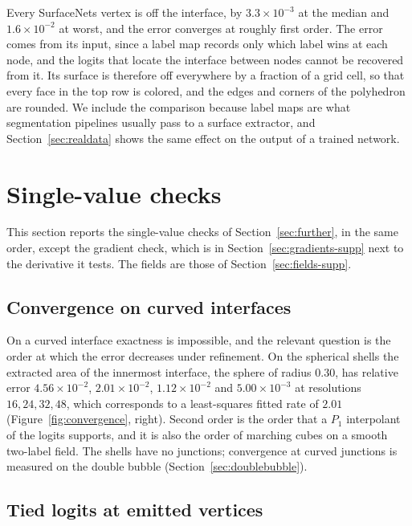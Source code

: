 \documentclass[11pt]{article}
\theoremstyle{definition}
\begin{document}
Every SurfaceNets vertex is off the interface, by $3.3\times10^{-3}$ at the
median and $1.6\times10^{-2}$ at worst, and the error converges at roughly
first order. The error comes from its input, since a label map records only
which label wins at each node, and the logits that locate the interface
between nodes cannot be recovered from it. Its
surface is therefore off everywhere by a fraction of a grid cell, so that
every face in the top row is colored, and the edges and corners of the
polyhedron are rounded. We include the
comparison because label maps are what segmentation pipelines usually pass to
a surface extractor, and Section~\ref{sec:realdata} shows the same effect on
the output of a trained network.

\section{Single-value checks}
\label{sec:checks-supp}

This section reports the single-value checks of Section~\ref{sec:further}, in the same order, except the gradient check, which is in
Section~\ref{sec:gradients-supp} next to the derivative it tests. The fields
are those of Section~\ref{sec:fields-supp}.

\subsection{Convergence on curved interfaces}
\label{sec:curved-supp}

On a curved interface exactness is impossible, and the relevant question is
the order at which the error decreases under refinement. On the spherical
shells the extracted area of the innermost interface, the sphere of radius
$0.30$, has relative error
$4.56\times10^{-2}$, $2.01\times10^{-2}$, $1.12\times10^{-2}$ and
$5.00\times10^{-3}$ at resolutions $16, 24, 32, 48$, which corresponds to a
least-squares fitted rate of $2.01$ (Figure~\ref{fig:convergence}, right).
Second order is the order that a $P_1$ interpolant of the logits supports,
and it is also the order of marching cubes on a smooth two-label field. The
shells have no junctions;
convergence at curved junctions is measured on the double bubble
(Section~\ref{sec:doublebubble}).

\subsection{Tied logits at emitted vertices}
\label{sec:consistency-supp}
\end{document}
